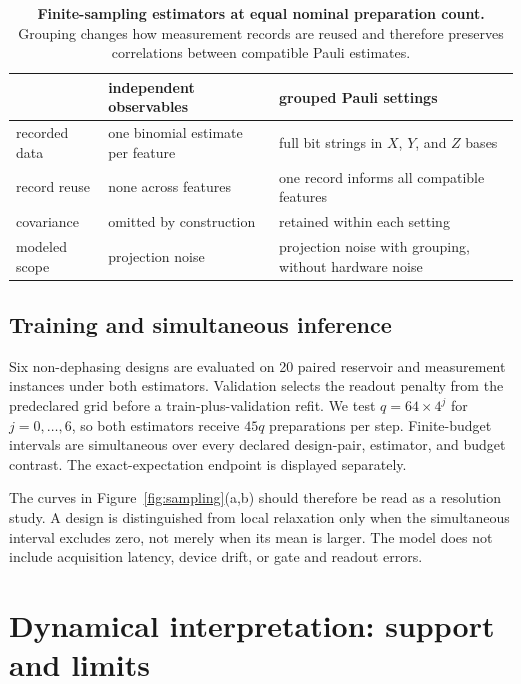 \begin{table}[H]
\centering
\caption{\textbf{Finite-sampling estimators at equal nominal preparation
count.} Grouping changes how measurement records are reused and therefore
preserves correlations between compatible Pauli estimates.}
\label{tab:sampling-estimators}
\footnotesize
\setlength{\tabcolsep}{6pt}
\renewcommand{\arraystretch}{1.12}
\begin{tabular}{@{}p{}p{}p{}@{}}
\toprule
 & independent observables & grouped Pauli settings\\
\midrule
recorded data
& one binomial estimate per feature
& full bit strings in \(X\), \(Y\), and \(Z\) bases\\
record reuse
& none across features
& one record informs all compatible features\\
covariance
& omitted by construction
& retained within each setting\\
modeled scope
& projection noise
& projection noise with grouping, without hardware noise\\
\bottomrule
\end{tabular}
\end{table}

\subsection{Training and simultaneous inference}

Six non-dephasing designs are evaluated on 20 paired reservoir and
measurement instances under both estimators.  Validation selects the readout
penalty from the predeclared grid before a
train-plus-validation refit.  We test \(q=64\times4^j\) for \(j=0,\ldots,6\),
so both estimators receive \(45q\) preparations per step.
Finite-budget intervals are simultaneous over every declared design-pair,
estimator, and budget contrast.  The exact-expectation endpoint is displayed
separately.

The curves in Figure~\ref{fig:sampling}(a,b) should therefore be read as a
resolution study. A design is distinguished from local relaxation only when
the simultaneous interval excludes zero, not merely when its mean is larger.
The model does not include acquisition latency, device drift, or gate and
readout errors.

\FloatBarrier
\section{Dynamical interpretation: support and limits}
\label{app:interpretation}

